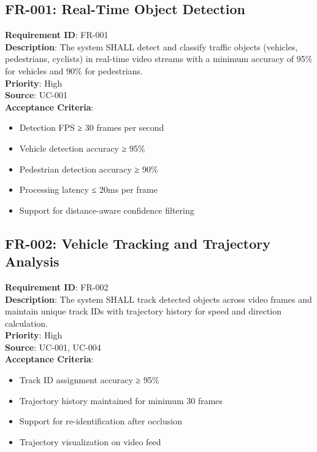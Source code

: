 \documentclass[12pt,a4paper]{article}
\begin{document}
\subsection{FR-001: Real-Time Object Detection}
\textbf{Requirement ID}: FR-001 \\
\textbf{Description}: The system SHALL detect and classify traffic objects (vehicles, pedestrians, cyclists) in real-time video streams with a minimum accuracy of 95\% for vehicles and 90\% for pedestrians. \\
\textbf{Priority}: High \\
\textbf{Source}: UC-001 \\
\textbf{Acceptance Criteria}:
\begin{itemize}
    \item Detection FPS ≥ 30 frames per second
    \item Vehicle detection accuracy ≥ 95\%
    \item Pedestrian detection accuracy ≥ 90\%
    \item Processing latency ≤ 20ms per frame
    \item Support for distance-aware confidence filtering
\end{itemize}

\subsection{FR-002: Vehicle Tracking and Trajectory Analysis}
\textbf{Requirement ID}: FR-002 \\
\textbf{Description}: The system SHALL track detected objects across video frames and maintain unique track IDs with trajectory history for speed and direction calculation. \\
\textbf{Priority}: High \\
\textbf{Source}: UC-001, UC-004 \\
\textbf{Acceptance Criteria}:
\begin{itemize}
    \item Track ID assignment accuracy ≥ 95\%
    \item Trajectory history maintained for minimum 30 frames
    \item Support for re-identification after occlusion
    \item Trajectory visualization on video feed
\end{itemize}
\end{document}
